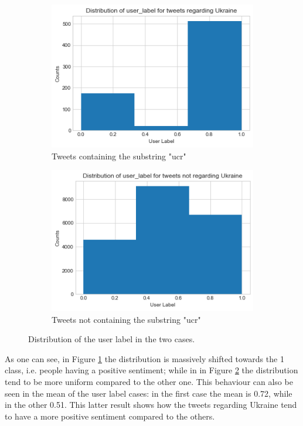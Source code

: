 \documentclass[sigchi]{acmart}
\begin{document}
\begin{figure}[b]
\begin{subfigure}{.48\columnwidth}
  \centering
  \includegraphics[width=\linewidth]{report/img/ucr3.png}
  \caption{Tweets containing the substring "ucr"}
  \label{fig:ucrtweet}
\end{subfigure}%
\hfill
\begin{subfigure}{.48\columnwidth}
  \centering
  \includegraphics[width=\linewidth]{report/img/rest3.png}
  \caption{Tweets not containing the substring "ucr"}
  \label{fig:resttweet}
\end{subfigure}
\caption{Distribution of the user label in the two cases.}
\label{fig:labeldistribution}
\end{figure}

As one can see, in Figure \ref{fig:ucrtweet} the distribution is massively shifted towards the 1 class, i.e. people having a positive sentiment; while in in Figure \ref{fig:resttweet} the distribution tend to be more uniform compared to the other one. This behaviour can also be seen in the mean of the user label cases: in the first case the mean is 0.72, while in the other 0.51. 
This latter result shows how the tweets regarding Ukraine tend to have a more positive sentiment compared to the others.
\end{document}
